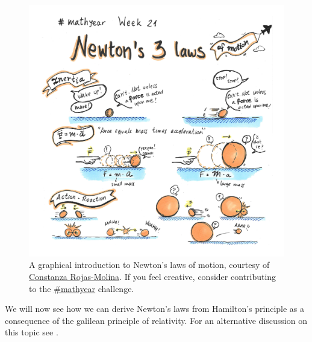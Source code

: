 \documentclass[english,fontsize=11pt,paper=a5,oneside]{scrbook}
\theoremstyle{definition}
\begin{document}
\begin{figure}[ht]
  \centering
  \includegraphics[width=.85\linewidth]{coni-mathyear-21-21.jpg}
  \caption{A graphical introduction to Newton's laws of motion,
    courtesy of \href{https://web.archive.org/web/20210602092955/https://twitter.com/Coni777/status/1399953219997032448}{Constanza Rojas-Molina}.
    If you feel creative, consider contributing to the
    \href{http://crojasmolina.com/illustration/the-mathyear-challenge/list-of-prompts-for-mathyear/}{\#mathyear} challenge.}
\end{figure}

We will now see how we can derive Newton's laws from Hamilton's principle as a consequence of the galilean principle of relativity. For an alternative discussion on this topic see \cite[Chapters 1.1 and 1.2]{book:arnold}.
\end{document}
